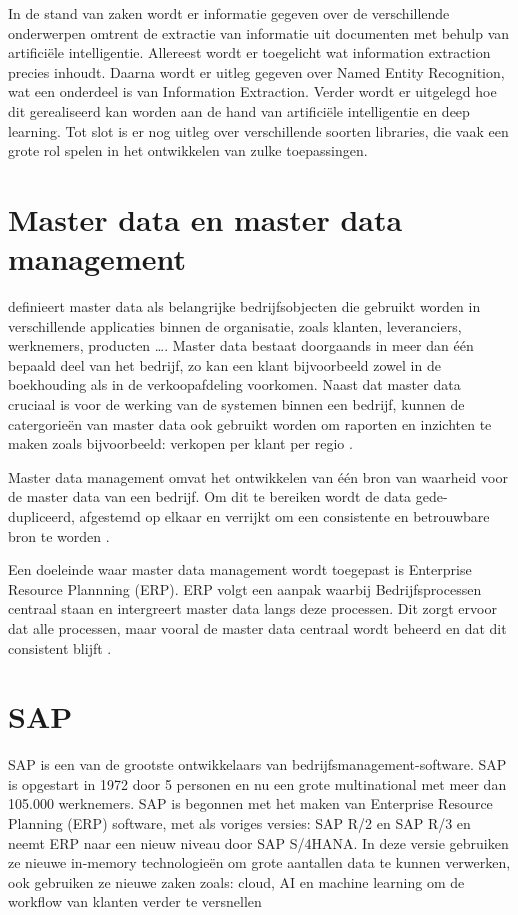 
In de stand van zaken wordt er informatie gegeven over de verschillende onderwerpen omtrent de extractie van informatie uit documenten met behulp van artificiële intelligentie. Allereest wordt er toegelicht wat information extraction precies inhoudt. Daarna wordt er uitleg gegeven over Named Entity Recognition, wat een onderdeel is van Information Extraction. Verder wordt er uitgelegd hoe dit gerealiseerd kan worden aan de hand van artificiële intelligentie en deep learning. Tot slot is er nog uitleg over verschillende soorten libraries, die vaak een grote rol spelen in het ontwikkelen van zulke toepassingen.

\section{Master data en master data management}

\textcite{loshin2010master} definieert master data als belangrijke bedrijfsobjecten die gebruikt worden in verschillende applicaties binnen de organisatie, zoals klanten, leveranciers, werknemers, producten \ldots. Master data bestaat doorgaands in meer dan één bepaald deel van het bedrijf, zo kan een klant bijvoorbeeld zowel in de boekhouding als in de verkoopafdeling voorkomen. Naast dat master data cruciaal is voor de werking van de systemen binnen een bedrijf, kunnen de catergorieën van master data ook gebruikt worden om raporten en inzichten te maken zoals bijvoorbeeld: verkopen per klant per regio \autocite{loshin2010master}.

Master data management omvat het ontwikkelen van één bron van waarheid voor de master data van een bedrijf. Om dit te bereiken wordt de data gede-dupliceerd, afgestemd op elkaar en verrijkt om een consistente en betrouwbare bron te worden \autocite{silvola2011managing}. 

Een doeleinde waar master data management wordt toegepast is Enterprise Resource Plannning (ERP). ERP volgt een aanpak waarbij Bedrijfsprocessen centraal staan en intergreert master data langs deze processen. Dit zorgt ervoor dat alle processen, maar vooral de master data centraal wordt beheerd en dat dit consistent blijft \autocite{maedche2010erp}.

\section{SAP}

SAP is een van de grootste ontwikkelaars van bedrijfsmanagement-software. SAP is opgestart in 1972 door 5 personen en nu een grote multinational met meer dan 105.000 werknemers. SAP is begonnen met het maken van Enterprise Resource Planning (ERP) software, met als voriges versies: SAP R/2 en SAP R/3 en neemt ERP naar een nieuw niveau door SAP S/4HANA. In deze versie gebruiken ze nieuwe in-memory technologieën om grote aantallen data te kunnen verwerken, ook gebruiken ze nieuwe zaken zoals: cloud, AI en machine learning om de workflow van klanten verder te versnellen \autocite{SAP} 

